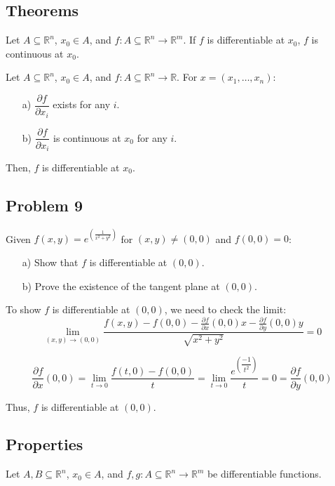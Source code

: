 \documentclass[11pt]{article}
\begin{document}
\subsection{Theorems}
Let \( A \subseteq \mathbb{R}^n \), \( x_0 \in A \), and \( f: A \subseteq \mathbb{R}^n \rightarrow \mathbb{R}^m \). If \( f \) is differentiable at \( x_0 \), \( f \) is continuous at \( x_0 \).


Let \( A \subseteq \mathbb{R}^n \), \( x_0 \in A \), and \( f: A \subseteq \mathbb{R}^n \rightarrow \mathbb{R} \). For \( x = (x_1, \ldots, x_n) \):
\begin{itemize}
    \item[a)] \( \dfrac{\partial f}{\partial x_i} \) exists for any \( i \).
    \item[b)] \( \dfrac{\partial f}{\partial x_i} \) is continuous at \( x_0 \) for any \( i \).
\end{itemize}
Then, \( f \) is differentiable at \( x_0 \).

\subsection*{Problem 9}
Given \( f(x,y) = e^{\left(\frac{1}{x^2 + y^2}\right)} \) for \( (x,y) \neq (0,0) \) and \( f(0,0) = 0 \):
\begin{itemize}
    \item[a)] Show that \( f \) is differentiable at \( (0,0) \).
    \item[b)] Prove the existence of the tangent plane at \( (0,0) \).
\end{itemize}

To show \( f \) is differentiable at \( (0,0) \), we need to check the limit:
\[
\lim_{(x,y) \to (0,0)} \frac{f(x,y) - f(0,0) - \frac{\partial f}{\partial x}(0,0)x - \frac{\partial f}{\partial y}(0,0)y}{\sqrt{x^2 + y^2}} = 0
\]

\[
\dfrac{\partial f}{\partial x} (0,0) = \lim_{t \to 0} \frac{f(t,0) - f(0,0)}{t} = \lim_{t \to 0} \frac{e^{\left(\dfrac{-1}{t^2}\right)}}{t} = 0 = \frac{\partial f}{\partial y} (0,0)
\]

Thus, \( f \) is differentiable at \( (0,0) \).

\subsection{Properties}

Let \( A, B \subseteq \mathbb{R}^n \), \( x_0 \in A \), and \( f, g : A \subseteq \mathbb{R}^n \rightarrow \mathbb{R}^m \) be differentiable functions.
\end{document}
